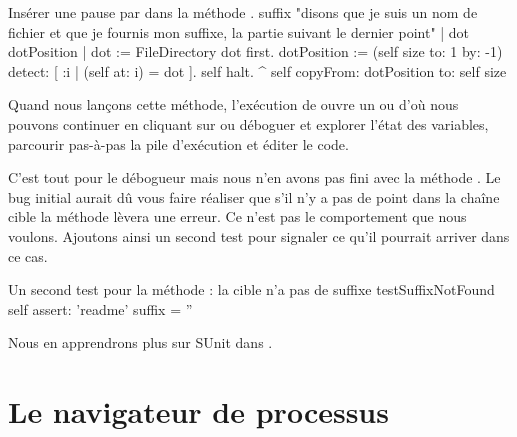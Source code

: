 \documentclass[a4paper,10pt,twoside]{book}
\begin{document}
\needspace{11ex}
\begin{method}[suffix]{Insérer une pause par  dans la méthode .}
suffix
	"disons que je suis un nom de fichier et que je fournis mon suffixe, la partie suivant le dernier point"
	| dot dotPosition |
	dot := FileDirectory dot first.
	dotPosition := (self size to: 1 by: -1) detect: [ :i | (self at: i) = dot ].
	self halt.
	^ self copyFrom: dotPosition to: self size 
\end{method}

Quand nous lançons cette méthode, l'exécution de  ouvre 
un  ou \emph{} d'où nous pouvons continuer 
en cliquant sur 
ou déboguer et explorer l'état des variables, parcourir pas-à-pas la pile d'exécution et éditer le code.

C'est tout pour le débogueur mais nous n'en avons pas fini avec la méthode .
Le bug initial aurait dû vous faire réaliser que s'il n'y a pas de point dans la chaîne 
cible la méthode  lèvera une erreur.
Ce n'est pas le comportement que nous voulons. Ajoutons ainsi un second test
pour signaler ce qu'il pourrait arriver dans ce cas.  

\begin{method}[testNoSuffix]{Un second test pour la méthode : la cible n'a pas de suffixe}
testSuffixNotFound
	self assert: 'readme' suffix = ''
\end{method}


Nous en apprendrons plus sur SUnit dans .


\section{Le navigateur de processus}
\end{document}
